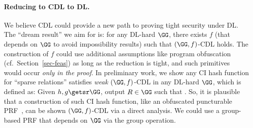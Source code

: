  \paragraph*{Reducing to CDL to DL.} We believe CDL could  provide a new path to proving tight security under DL. %
 The ``dream result'' we aim for is: for any DL-hard $\GG$, there exists $f$ (that depends on $\GG$ to avoid impossibility results) such that $(\GG,f)$-CDL holds. %
The construction of $f$ could use additional assumptions like program obfuscation (cf.~Section~\ref{sec-feas}) as long as the reduction is tight, and such primitives would occur \emph{only in the proof}. In preliminary work, we show any CI hash function for ``sparse relations''  satisfies   \emph{weak} $(\GG,f)$-CDL in any DL-hard $\GG$, which is defined as: Given $h,g \getsr \GG$, output $R \in \GG$ such that .  So, it is plausible that a construction of such CI hash function, like an obfuscated puncturable PRF~\cite{EC:CCRR18}, can be shown $(\GG,f)$-CDL via  a direct analysis.  We could use a group-based PRF that depends on $\GG$ via the group operation. %




